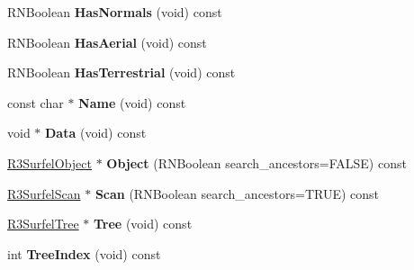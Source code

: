 \begin{DoxyCompactItemize}
\item 
R\+N\+Boolean {\bfseries Has\+Normals} (void) const \hypertarget{class_r3_surfel_node_ab56e99bddd5c9e44f9ef29a292e36bb7}{}\label{class_r3_surfel_node_ab56e99bddd5c9e44f9ef29a292e36bb7}

\item 
R\+N\+Boolean {\bfseries Has\+Aerial} (void) const \hypertarget{class_r3_surfel_node_a5f86daa3ae678fe52eb5c49d65afe390}{}\label{class_r3_surfel_node_a5f86daa3ae678fe52eb5c49d65afe390}

\item 
R\+N\+Boolean {\bfseries Has\+Terrestrial} (void) const \hypertarget{class_r3_surfel_node_a4f8ca2dcb75846f4a94e91dfa6dc61b5}{}\label{class_r3_surfel_node_a4f8ca2dcb75846f4a94e91dfa6dc61b5}

\item 
const char $\ast$ {\bfseries Name} (void) const \hypertarget{class_r3_surfel_node_a05ab34f60f1e9677d35810e74a8d5057}{}\label{class_r3_surfel_node_a05ab34f60f1e9677d35810e74a8d5057}

\item 
void $\ast$ {\bfseries Data} (void) const \hypertarget{class_r3_surfel_node_a0a1472eb4992eeef418dc97cd4bd93ee}{}\label{class_r3_surfel_node_a0a1472eb4992eeef418dc97cd4bd93ee}

\item 
\hyperlink{class_r3_surfel_object}{R3\+Surfel\+Object} $\ast$ {\bfseries Object} (R\+N\+Boolean search\+\_\+ancestors=F\+A\+L\+SE) const \hypertarget{class_r3_surfel_node_afc3c7b3f10a644416234fbf48b070a87}{}\label{class_r3_surfel_node_afc3c7b3f10a644416234fbf48b070a87}

\item 
\hyperlink{class_r3_surfel_scan}{R3\+Surfel\+Scan} $\ast$ {\bfseries Scan} (R\+N\+Boolean search\+\_\+ancestors=T\+R\+UE) const \hypertarget{class_r3_surfel_node_a64d6b3487c2ec515b19c073026d06238}{}\label{class_r3_surfel_node_a64d6b3487c2ec515b19c073026d06238}

\item 
\hyperlink{class_r3_surfel_tree}{R3\+Surfel\+Tree} $\ast$ {\bfseries Tree} (void) const \hypertarget{class_r3_surfel_node_a47c4447d9e917649b2322760bfd80ab5}{}\label{class_r3_surfel_node_a47c4447d9e917649b2322760bfd80ab5}

\item 
int {\bfseries Tree\+Index} (void) const \hypertarget{class_r3_surfel_node_a0ce80e0496836ff71a22361e96a8733a}{}\label{class_r3_surfel_node_a0ce80e0496836ff71a22361e96a8733a}


\end{DoxyCompactItemize}
